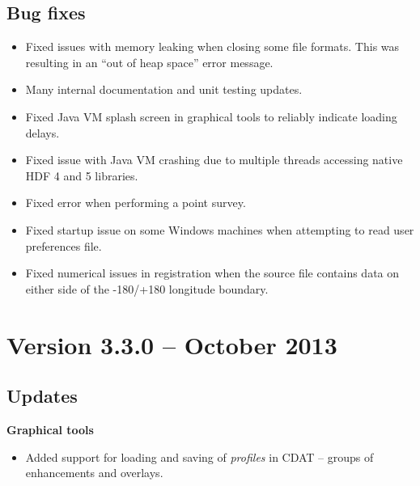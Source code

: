 \subsection*{ Bug fixes}
\begin{itemize}

  \item Fixed issues with memory leaking when closing some file formats.  This
  was resulting in an ``out of heap space'' error message.

  \item Many internal documentation and unit testing updates.

  \item Fixed Java VM splash screen in graphical tools to reliably indicate
  loading delays.

  \item Fixed issue with Java VM crashing due to multiple threads accessing
  native HDF 4 and 5 libraries.

  \item Fixed error when performing a point survey.

  \item Fixed startup issue on some Windows machines when attempting to
  read user preferences file.

  \item Fixed numerical issues in registration when the source file contains
  data on either side of the -180/+180 longitude boundary.

\end{itemize}


\section{Version 3.3.0 -- October 2013}

\subsection*{ Updates}

\hspace{0.4cm} {\bf Graphical tools}

\begin{itemize}

  \item Added support for loading and saving of {\em profiles} in CDAT --
  groups of enhancements and overlays.


\end{itemize}

